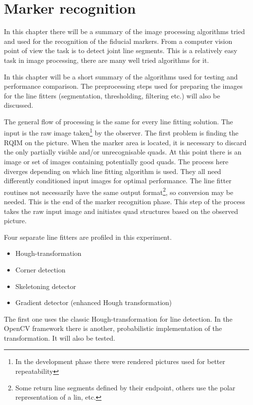 \chapter{Marker recognition}\label{sect:markerRec}

In this chapter there will be a summary of the image processing algorithms tried and used for the recognition of the fiducial markers.
From a computer vision point of view the task is to detect joint line segments.
This is a relatively easy task in image processing, there are many well tried algorithms for it.

In this chapter will be a short summary of the algorithms used for testing and performance comparison.
The preprocessing steps used for preparing the images for the line fitters (segmentation, thresholding, filtering etc.) will also be discussed.

The general flow of processing is the same for every line fitting solution.
The input is the raw image taken\footnote{In the development phase there were rendered pictures used for better repeatability} by the observer.
The first problem is finding the RQIM on the picture.
When the marker area is located, it is necessary to discard the only partially visible and/or unrecognisable quads.
At this point there is an image or set of images containing potentially good quads.
The process here diverges depending on which line fitting algorithm is used.
They all need differently conditioned input images for optimal performance.
The line fitter routines not necessarily have the same output format\footnote{Some return line segments defined by their endpoint, others use the polar representation of a lin, etc.}, so conversion may be needed.
This is the end of the marker recognition phase.
This step of the process takes the raw input image and initiates quad structures based on the observed picture.

Four separate line fitters are profiled in this experiment.
\begin{itemize}
	\item Hough-transformation
	\item Corner detection
	\item Skeletoning detector
	\item Gradient detector (enhanced Hough transformation)
\end{itemize}
The first one uses the classic Hough-transformation for line detection.
In the OpenCV framework there is another, probabilistic implementation of the transformation.
It will also be tested.

